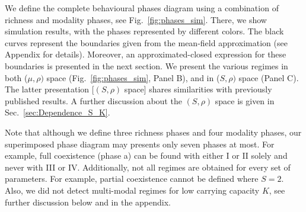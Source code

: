 \documentclass[%
 amsmath,amssymb,
reprint,%
linenumbers]{revtex4-2}
\begin{document}
We define the complete behavioural phases diagram using a combination of richness and modality phases, see  Fig.~\ref{fig:phases_sim}. 
There, we show simulation results, with the phases represented by different colors. 
The black curves represent the boundaries given from the mean-field approximation (see Appendix for details). Moreover, an approximated-closed expression for these boundaries is presented in the next section. 
We present the various regimes in both  ($\mu,\rho)$ space (Fig.~\ref{fig:phases_sim}, Panel B), and in ($S,\rho)$ space (Panel C). 
The latter presentation [$(S,\rho)$ space] shares similarities with previously published results. 
A further discussion about the $(S,\rho)$ space is given in Sec.~\ref{sec:Dependence_S_K}.

Note that although we define three richness phases and four modality phases, our superimposed phase diagram may presents only seven phases at most. 
For example, full coexistence (phase a) can be found with either I or II solely and never with III or IV.  
Additionally, not all regimes are obtained for every set of parameters. 
For example, partial coexistence cannot be defined where $S=2$. 
Also, we did not detect multi-modal regimes for low carrying capacity $K$, see further discussion below and in the appendix. 


\end{document}
